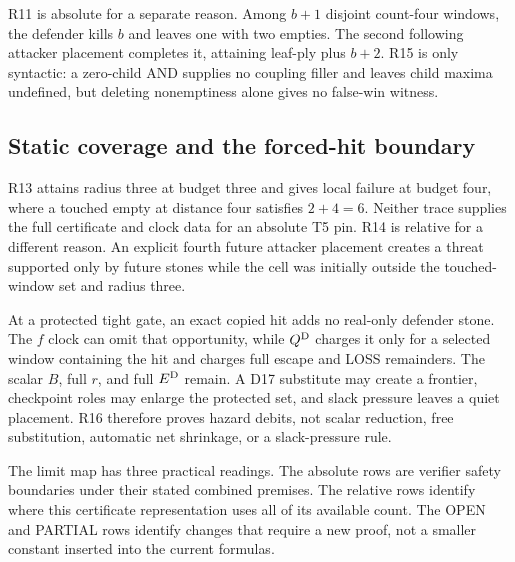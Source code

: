 R11 is absolute for a separate reason.  Among $b+1$ disjoint count-four
windows, the defender kills $b$ and leaves one with two empties.  The second
following attacker placement completes it, attaining leaf-ply plus $b+2$.
R15 is only syntactic: a zero-child AND supplies no coupling filler and leaves
child maxima undefined, but deleting nonemptiness alone gives no false-win
witness.

\subsection{Static coverage and the forced-hit boundary}

R13 attains radius three at budget three and gives local failure at budget
four, where a touched empty at distance four satisfies $2+4=6$.  Neither
trace supplies the full certificate and clock data for an absolute T5 pin.
R14 is relative for a different reason.  An explicit fourth future attacker
placement creates a threat supported only by future stones while the cell was
initially outside the touched-window set and radius three.

At a protected tight gate, an exact copied hit adds no real-only defender
stone.  The $f$ clock can omit that opportunity, while $Q^{\mathrm{D}}$ charges it
only for a selected window containing the hit and charges full escape and
LOSS remainders.  The scalar $B$, full $r$, and full $E^{\mathrm{D}}$ remain.
A D17 substitute may create a frontier, checkpoint roles may enlarge the
protected set, and slack pressure leaves a quiet placement.  R16 therefore
proves hazard debits, not scalar reduction, free substitution, automatic net
shrinkage, or a slack-pressure rule.

The limit map has three practical readings.  The absolute rows are verifier
safety boundaries under their stated combined premises.  The relative rows
identify where this certificate representation uses all of its available
count.  The OPEN and PARTIAL rows identify changes that require a new proof,
not a smaller constant inserted into the current formulas.
